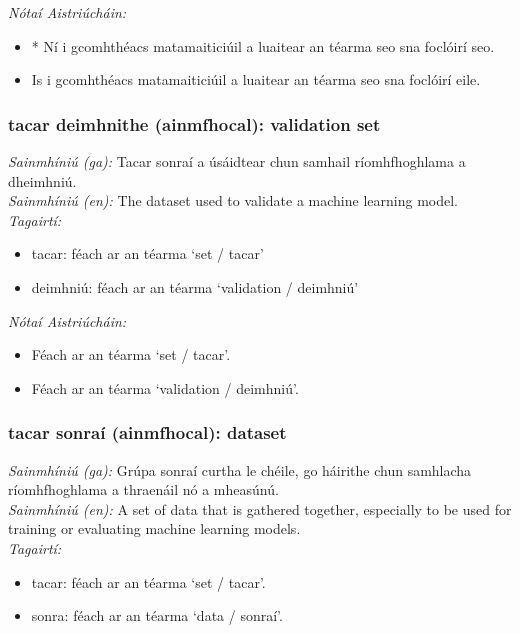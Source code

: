  \noindent \textit{Nótaí Aistriúcháin:}
\begin{itemize}
	\item * Ní i gcomhthéacs matamaiticiúil a luaitear an téarma seo sna foclóirí seo.
	\item Is i gcomhthéacs matamaiticiúil a luaitear an téarma seo sna foclóirí eile.
\end{itemize}


\subsubsection*{tacar deimhnithe (ainmfhocal): validation set}
 \noindent \textit{Sainmhíniú (ga):} Tacar sonraí a úsáidtear chun samhail ríomhfhoghlama a dheimhniú.
\\
 \noindent \textit{Sainmhíniú (en):} The dataset used to validate a machine learning model.
\\
 \noindent \textit{Tagairtí:}
\begin{itemize}
	\item tacar: féach ar an téarma `set / tacar'
	\item deimhniú: féach ar an téarma `validation / deimhniú'
\end{itemize}

 \noindent \textit{Nótaí Aistriúcháin:}
\begin{itemize}
	\item Féach ar an téarma `set / tacar'.
	\item Féach ar an téarma `validation / deimhniú'.
\end{itemize}


\subsubsection*{tacar sonraí (ainmfhocal): dataset}
 \noindent \textit{Sainmhíniú (ga):} Grúpa sonraí curtha le chéile, go háirithe chun samhlacha ríomhfhoghlama a thraenáil nó a mheasúnú.
\\
 \noindent \textit{Sainmhíniú (en):} A set of data that is gathered together, especially to be used for training or evaluating machine learning models.
\\
 \noindent \textit{Tagairtí:}
\begin{itemize}
	\item tacar: féach ar an téarma `set / tacar'.
	\item sonra: féach ar an téarma `data / sonraí'.
\end{itemize}

